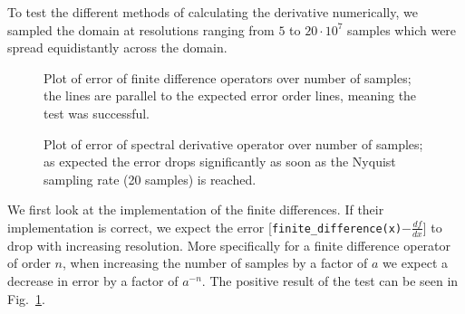 To test the different methods of calculating the derivative numerically, we sampled the domain at resolutions ranging from $5$ to $20\cdot 10^7$ samples which were spread equidistantly across the domain.
\begin{figure}[!h]
    \caption{Plot of error of finite difference operators over number of samples;
    the lines are parallel to the expected error order lines, meaning the test was successful.}
    \label{fig:derivative_error}
\end{figure}
\begin{figure}[!h]
    \caption{Plot of error of spectral derivative operator over number of samples;
    as expected the error drops significantly as soon as the Nyquist sampling rate (20 samples) is reached.}
    \label{fig:fft_error}
\end{figure}
We first look at the implementation of the finite differences.
If their implementation is correct, we expect the error [\texttt{finite\_difference(x)}$-\frac{df}{dx}$] to drop with increasing resolution.
More specifically for a finite difference operator of order $n$, when increasing the number of samples by a factor of $a$ we expect a decrease in error by a factor of $a^{-n}$.
The positive result of the test can be seen in Fig.~\ref{fig:derivative_error}.

